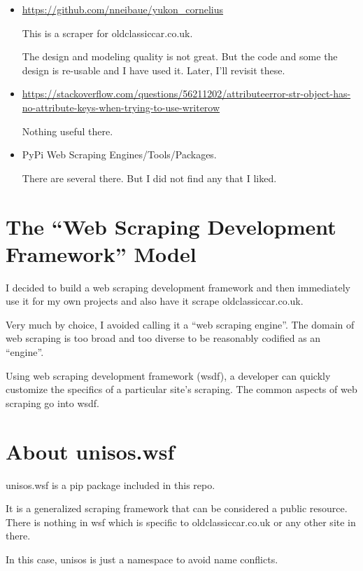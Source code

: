 \documentclass{article}
\begin{document}
\begin{itemize}
  \item \url{https://github.com/nneibaue/yukon_cornelius}

        This is a scraper for oldclassiccar.co.uk.

        The design and modeling quality is not great. But the
        code and some the design is re-usable and I have used it. Later, I'll revisit these.

  \item \url{https://stackoverflow.com/questions/56211202/attributeerror-str-object-has-no-attribute-keys-when-trying-to-use-writerow}

  Nothing useful there.

  \item PyPi Web Scraping Engines/Tools/Packages.

  There are several there. But I did not find any that I liked.

\end{itemize}


\section{The ``Web Scraping Development Framework'' Model}

I decided to build a web scraping development framework and then
immediately use it for my own projects and also have it scrape
oldclassiccar.co.uk.

Very much by choice, I avoided calling it a ``web scraping engine''.
The domain of web scraping is too broad and too diverse to be
reasonably codified as an ``engine''.

Using web scraping development framework (wsdf), a developer can
quickly customize the specifics of a particular site's scraping.
The common aspects of web scraping go into wsdf.

\section{About unisos.wsf}

unisos.wsf is a pip package included in this repo.

It is a generalized scraping framework that can be considered a
public resource. There is nothing in wsf which is specific to
oldclassiccar.co.uk or any other site in there.

In this case, unisos is just a namespace to avoid name conflicts.
\end{document}
